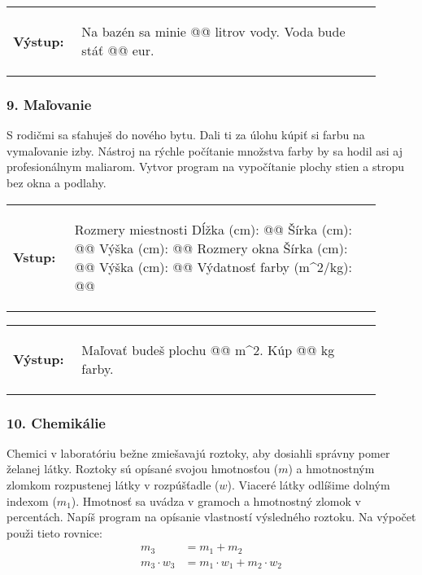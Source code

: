 \vspace{-2em}
\begin{tabular}{@{}p{0.15\linewidth}p{0.75\linewidth}}
\textbf{\small Výstup:} &
\vspace{-3em}
\begin{code}
Na bazén sa minie @\fbox{\phantom{vstup}}@ litrov vody.
Voda bude stáť @\fbox{\phantom{vstup}}@ eur.
\end{code}
\end{tabular}
\vspace{-2em}

\subsubsection*{9. Maľovanie}
S rodičmi sa sťahuješ do nového bytu. Dali ti za úlohu kúpiť si farbu na vymaľovanie izby. Nástroj na rýchle počítanie množstva farby by sa hodil asi aj profesionálnym maliarom. Vytvor program na vypočítanie plochy stien a stropu bez okna a podlahy.

\begin{tabular}{@{}p{0.15\linewidth}p{0.75\linewidth}}
\textbf{\small Vstup:} &
\vspace{-3em}
\begin{code}
Rozmery miestnosti
Dĺžka (cm): @\fbox{\phantom{vstup}}@
Šírka (cm): @\fbox{\phantom{vstup}}@
Výška (cm): @\fbox{\phantom{vstup}}@
Rozmery okna
Šírka (cm): @\fbox{\phantom{vstup}}@
Výška (cm): @\fbox{\phantom{vstup}}@
Výdatnosť farby (m^2/kg): @\fbox{\phantom{vstup}}@
\end{code}
\end{tabular}

\vspace{-2em}
\begin{tabular}{@{}p{0.15\linewidth}p{0.75\linewidth}}
\textbf{\small Výstup:} &
\vspace{-3em}
\begin{code}
Maľovať budeš plochu @\fbox{\phantom{vstup}}@ m^2.
Kúp @\fbox{\phantom{vstup}}@ kg farby.
\end{code}
\end{tabular}
\vspace{-2em}

\subsubsection*{10. Chemikálie}
Chemici v laboratóriu bežne zmiešavajú roztoky, aby dosiahli správny pomer želanej látky. Roztoky sú opísané svojou hmotnosťou ($m$) a hmotnostným zlomkom rozpustenej látky v rozpúšťadle ($w$). Viaceré látky odlíšime dolným indexom ($m_1$).  Hmotnosť sa uvádza v gramoch a hmotnostný zlomok v percentách. Napíš program na opísanie vlastností výsledného roztoku. Na výpočet použi tieto rovnice:
\begin{align*}
m_3 &= m_1 + m_2 \\
m_3 \cdot w_3 &= m_1 \cdot w_1 +  m_2 \cdot w_2
\end{align*}

